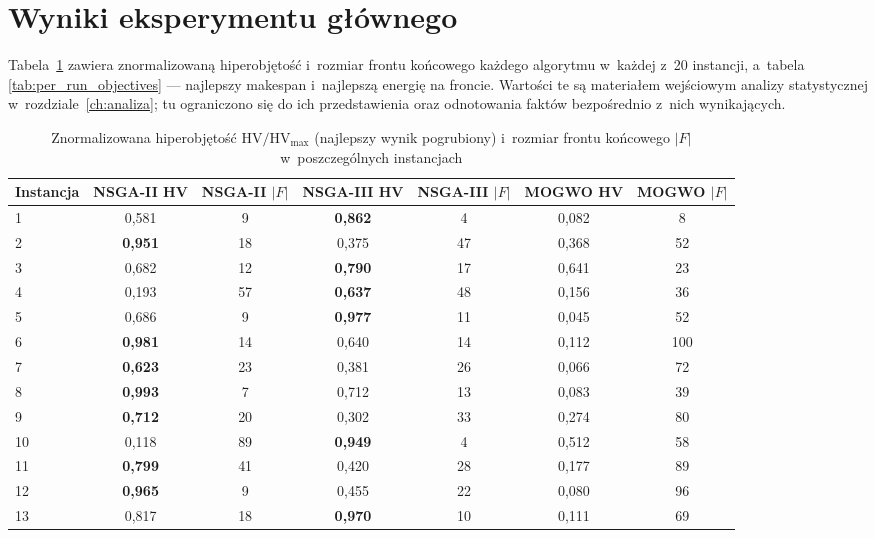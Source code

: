 \section{Wyniki eksperymentu głównego}
\label{sec:wyniki_glowny}

Tabela~\ref{tab:per_run} zawiera znormalizowaną hiperobjętość i~rozmiar frontu
końcowego każdego algorytmu w~każdej z~20 instancji, a~tabela
\ref{tab:per_run_objectives} --- najlepszy makespan i~najlepszą energię na
froncie. Wartości te są materiałem wejściowym analizy statystycznej
w~rozdziale~\ref{ch:analiza}; tu ograniczono się do ich przedstawienia oraz
odnotowania faktów bezpośrednio z~nich wynikających.

\begin{table}[htbp]
    \centering
    \caption{Znormalizowana hiperobjętość $\mathrm{HV}/\mathrm{HV}_{\max}$ (najlepszy wynik pogrubiony) i~rozmiar frontu końcowego $|F|$ w~poszczególnych instancjach}
    \label{tab:per_run}
    \begin{tabular}{l c c c c c c}
        \hline
        Instancja & NSGA-II HV & NSGA-II $|F|$ & NSGA-III HV & NSGA-III $|F|$ & MOGWO HV & MOGWO $|F|$ \\
        \hline
        1 & 0{,}581 & 9 & \textbf{0{,}862} & 4 & 0{,}082 & 8 \\
        2 & \textbf{0{,}951} & 18 & 0{,}375 & 47 & 0{,}368 & 52 \\
        3 & 0{,}682 & 12 & \textbf{0{,}790} & 17 & 0{,}641 & 23 \\
        4 & 0{,}193 & 57 & \textbf{0{,}637} & 48 & 0{,}156 & 36 \\
        5 & 0{,}686 & 9 & \textbf{0{,}977} & 11 & 0{,}045 & 52 \\
        6 & \textbf{0{,}981} & 14 & 0{,}640 & 14 & 0{,}112 & 100 \\
        7 & \textbf{0{,}623} & 23 & 0{,}381 & 26 & 0{,}066 & 72 \\
        8 & \textbf{0{,}993} & 7 & 0{,}712 & 13 & 0{,}083 & 39 \\
        9 & \textbf{0{,}712} & 20 & 0{,}302 & 33 & 0{,}274 & 80 \\
        10 & 0{,}118 & 89 & \textbf{0{,}949} & 4 & 0{,}512 & 58 \\
        11 & \textbf{0{,}799} & 41 & 0{,}420 & 28 & 0{,}177 & 89 \\
        12 & \textbf{0{,}965} & 9 & 0{,}455 & 22 & 0{,}080 & 96 \\
        13 & 0{,}817 & 18 & \textbf{0{,}970} & 10 & 0{,}111 & 69 \\

\end{tabular}
\end{table}
